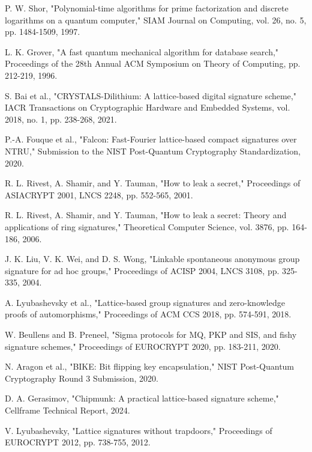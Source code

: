 \documentclass[11pt,a4paper]{article}
\begin{document}
\begin{thebibliography}{99}

P. W. Shor, "Polynomial-time algorithms for prime factorization and discrete logarithms on a quantum computer," SIAM Journal on Computing, vol. 26, no. 5, pp. 1484-1509, 1997.

L. K. Grover, "A fast quantum mechanical algorithm for database search," Proceedings of the 28th Annual ACM Symposium on Theory of Computing, pp. 212-219, 1996.

S. Bai et al., "CRYSTALS-Dilithium: A lattice-based digital signature scheme," IACR Transactions on Cryptographic Hardware and Embedded Systems, vol. 2018, no. 1, pp. 238-268, 2021.

P.-A. Fouque et al., "Falcon: Fast-Fourier lattice-based compact signatures over NTRU," Submission to the NIST Post-Quantum Cryptography Standardization, 2020.

R. L. Rivest, A. Shamir, and Y. Tauman, "How to leak a secret," Proceedings of ASIACRYPT 2001, LNCS 2248, pp. 552-565, 2001.

R. L. Rivest, A. Shamir, and Y. Tauman, "How to leak a secret: Theory and applications of ring signatures," Theoretical Computer Science, vol. 3876, pp. 164-186, 2006.

J. K. Liu, V. K. Wei, and D. S. Wong, "Linkable spontaneous anonymous group signature for ad hoc groups," Proceedings of ACISP 2004, LNCS 3108, pp. 325-335, 2004.

A. Lyubashevsky et al., "Lattice-based group signatures and zero-knowledge proofs of automorphisms," Proceedings of ACM CCS 2018, pp. 574-591, 2018.

W. Beullens and B. Preneel, "Sigma protocols for MQ, PKP and SIS, and fishy signature schemes," Proceedings of EUROCRYPT 2020, pp. 183-211, 2020.

N. Aragon et al., "BIKE: Bit flipping key encapsulation," NIST Post-Quantum Cryptography Round 3 Submission, 2020.

D. A. Gerasimov, "Chipmunk: A practical lattice-based signature scheme," Cellframe Technical Report, 2024.

V. Lyubashevsky, "Lattice signatures without trapdoors," Proceedings of EUROCRYPT 2012, pp. 738-755, 2012.


\end{thebibliography}
\end{document}
